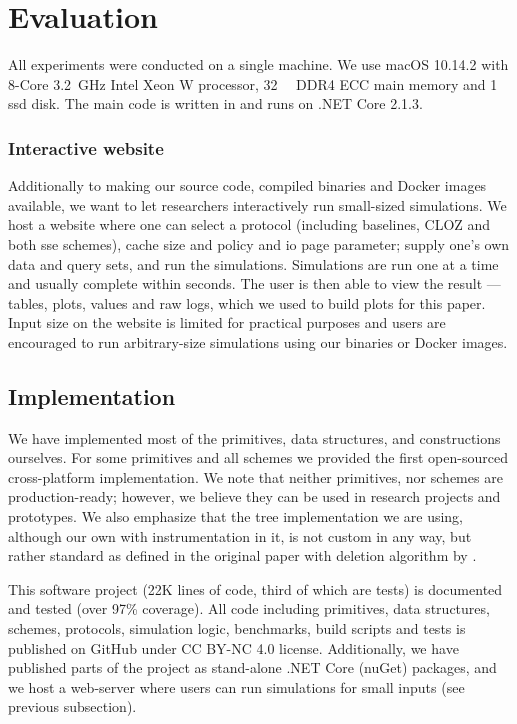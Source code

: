 \section{Evaluation}\label{section:range-snapshot:evaluation}

	All experiments were conducted on a single machine.
	We use macOS 10.14.2 with 8-Core \SI{3.2}{\giga\hertz} Intel Xeon W processor, \SI{32}{\giga\byte} DDR4 ECC main memory and \SI{1}{\tera\byte} \acrshort{ssd} disk.
	The main code is written in {\Csharp} and runs on {.NET Core 2.1.3}.

	\subsubsection*{Interactive website}\label{section:range-snapshot:website}

		Additionally to making our source code, compiled binaries and Docker images available, we want to let researchers interactively run small-sized simulations.
		We host a website \cite{ore-website} where one can select a protocol (including baselines, CLOZ \cite{parameter-hiding-ore} and both \acrshort{sse} schemes), cache size and policy and \acrshort{io} page parameter; supply one's own data and query sets, and run the simulations.
		Simulations are run one at a time and usually complete within seconds.
		The user is then able to view the result --- tables, plots, values and raw logs, which we used to build plots for this paper.
		Input size on the website is limited for practical purposes and users are encouraged to run arbitrary-size simulations using our binaries or Docker images.

	\subsection{Implementation}

		We have implemented most of the primitives, data structures, and constructions ourselves.
		For some primitives and all schemes we provided the first open-sourced cross-platform {\Csharp} implementation.
		We note that neither primitives, nor schemes are production-ready; however, we believe they can be used in research projects and prototypes.
		We also emphasize that the {\BPlus} tree implementation we are using, although our own with instrumentation in it, is not custom in any way, but rather standard as defined in the original paper \cite{b-tree} with deletion algorithm by \cite{b-plus-tree-deletion}.

		This software project (22K lines of code, third of which are tests) is documented and tested (over 97\% coverage).
		All code including primitives, data structures, schemes, protocols, simulation logic, benchmarks, build scripts and tests is published on GitHub \cite{ore-project} under CC BY-NC 4.0 license.
		Additionally, we have published parts of the project as stand-alone {.NET Core} (nuGet) packages, and we host a web-server where users can run simulations for small inputs (see previous subsection).


